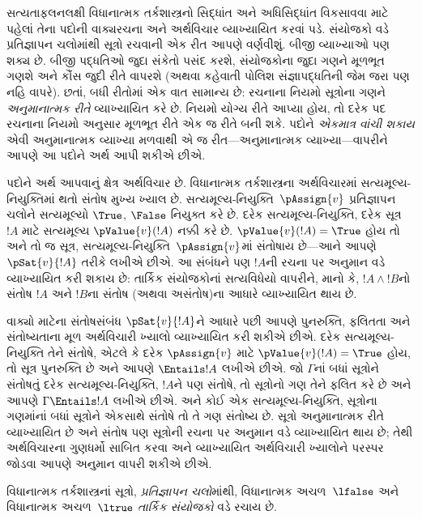 સત્યતાફલનલક્ષી વિધાનાત્મક તર્કશાસ્ત્રનો સિદ્ધાંત અને અધિસિદ્ધાંત
વિકસાવવા માટે પહેલાં તેના પદોની વાક્યરચના અને અર્થવિચાર વ્યાખ્યાયિત
કરવાં પડે. સંયોજકો વડે પ્રતિજ્ઞાપન ચલોમાંથી
સૂત્રો રચવાની એક રીત આપણે વર્ણવીશું. બીજી વ્યાખ્યાઓ પણ શક્ય
છે. બીજી પદ્ધતિઓ જુદા સંકેતો પસંદ કરશે, સંયોજકોના જુદા ગણને મૂળભૂત
ગણશે અને કૌંસ જુદી રીતે વાપરશે (અથવા કહેવાતી પોલિશ સંજ્ઞાપદ્ધતિની
જેમ જરા પણ નહિ વાપરે). છતાં, બધી રીતોમાં એક વાત સામાન્ય છે: રચનાના
નિયમો સૂત્રોના ગણને \emph{અનુમાનાત્મક રીતે} વ્યાખ્યાયિત કરે છે.
નિયમો યોગ્ય રીતે આપ્યા હોય, તો દરેક પદ રચનાના નિયમો અનુસાર મૂળભૂત રીતે
એક જ રીતે બની શકે. પદોને \emph{એકમાત્ર વાંચી શકાય} એવી અનુમાનાત્મક
વ્યાખ્યા મળવાથી એ જ રીત---અનુમાનાત્મક વ્યાખ્યા---વાપરીને આપણે આ
પદોને અર્થ આપી શકીએ છીએ.

પદોને અર્થ આપવાનું ક્ષેત્ર અર્થવિચાર છે. વિધાનાત્મક તર્કશાસ્ત્રના
અર્થવિચારમાં સત્યમૂલ્ય-નિયુક્તિમાં થતો સંતોષ મુખ્ય ખ્યાલ છે.
સત્યમૂલ્ય-નિયુક્તિ~$\pAssign{v}$ પ્રતિજ્ઞાપન ચલોને સત્યમૂલ્યો
$\True$, $\False$ નિયુક્ત કરે છે. દરેક સત્યમૂલ્ય-નિયુક્તિ, દરેક
સૂત્ર~$!A$ માટે સત્યમૂલ્ય $\pValue{v}(!A)$ નક્કી કરે છે.
$\pValue{v}(!A)=\True$ હોય તો અને તો જ સૂત્ર,
સત્યમૂલ્ય-નિયુક્તિ~$\pAssign{v}$માં સંતોષાય છે---આને આપણે
$\pSat{v}{!A}$ તરીકે લખીએ છીએ. આ સંબંધને પણ $!A$ની રચના પર અનુમાન
વડે વ્યાખ્યાયિત કરી શકાય છે: તાર્કિક સંયોજકોનાં સત્યવિધેયો વાપરીને,
માનો કે, $!A\land !B$નો સંતોષ $!A$ અને $!B$ના સંતોષ (અથવા
અસંતોષ)ના આધારે વ્યાખ્યાયિત થાય છે.

વાક્યો માટેના સંતોષસંબંધ $\pSat{v}{!A}$ને આધારે પછી આપણે પુનરુક્તિ,
ફલિતતા અને સંતોષ્યતાના મૂળ અર્થવિચારી ખ્યાલો વ્યાખ્યાયિત કરી શકીએ
છીએ. દરેક સત્યમૂલ્ય-નિયુક્તિ તેને સંતોષે, એટલે કે દરેક $\pAssign{v}$ માટે
$\pValue{v}(!A)=\True$ હોય, તો સૂત્ર પુનરુક્તિ છે અને આપણે
$\Entails !A$ લખીએ છીએ. જો $\Gamma$નાં બધાં સૂત્રોને સંતોષતું
દરેક સત્યમૂલ્ય-નિયુક્તિ, $!A$ને પણ સંતોષે, તો સૂત્રોનો ગણ તેને
ફલિત કરે છે અને આપણે $\Gamma\Entails !A$ લખીએ છીએ. અને કોઈ એક
સત્યમૂલ્ય-નિયુક્તિ, સૂત્રોના ગણમાંનાં બધાં સૂત્રોને એકસાથે સંતોષે તો
તે ગણ સંતોષ્ય છે. સૂત્રો અનુમાનાત્મક રીતે વ્યાખ્યાયિત છે અને
સંતોષ પણ સૂત્રોની રચના પર અનુમાન વડે વ્યાખ્યાયિત થાય છે; તેથી
અર્થવિચારના ગુણધર્મો સાબિત કરવા અને વ્યાખ્યાયિત અર્થવિચારી ખ્યાલોને
પરસ્પર જોડવા આપણે અનુમાન વાપરી શકીએ છીએ.
\endgroup


\begingroup
\makeatletter{}\makeatother


\label{guunit:OLP-0058}


વિધાનાત્મક તર્કશાસ્ત્રનાં સૂત્રો,
\emph{પ્રતિજ્ઞાપન ચલો}માંથી,
  વિધાનાત્મક અચળ~$\lfalse$
    અને વિધાનાત્મક અચળ~$\ltrue$ \emph{તાર્કિક સંયોજકો} વડે
રચાય છે.

